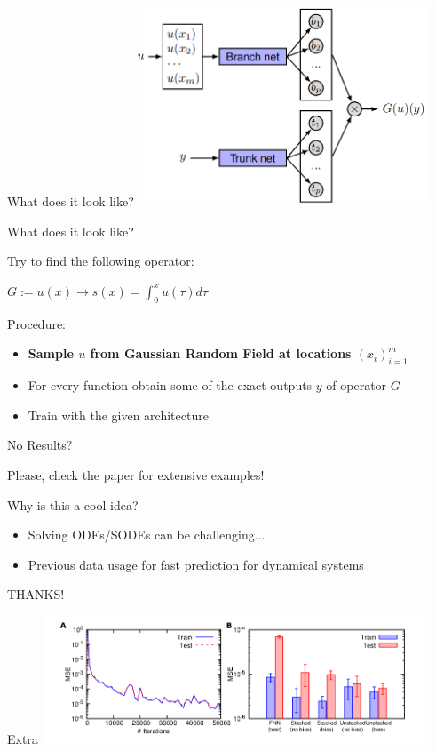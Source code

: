 \documentclass[aspectratio=169]{beamer}
\begin{document}
\begin{frame}{What does it look like?}
  \centering
    \includegraphics[width=0.65\textwidth]{Figures/pic.png}
\end{frame}

\begin{frame}{What does it look like?}
  \begin{minipage}{0.5\textwidth}
    \centering
     Try to find the following operator:

      $G:=u(x)\to s(x)=\int_0^x u(\tau)d\tau$

  \end{minipage}%
  \begin{minipage}{0.5\textwidth}
    \centering
     Procedure:
     \begin{itemize}
       \item \textbf{Sample $u$ from Gaussian  Random Field at locations $(x_i)_{i=1}^m$}
       \item For every function obtain some of the exact outputs $y$ of operator $G$
       \item Train with the given architecture
     \end{itemize}
  \end{minipage}
\end{frame}

\begin{frame}{No Results?}

  \color{Pink} Please, check the paper for extensive examples!

\end{frame}

\begin{frame}{Why is this a cool idea?}

    \begin{itemize}
       \item Solving ODEs/SODEs can be challenging...
       \item Previous data usage for fast prediction for dynamical systems
     \end{itemize} 

\end{frame}


\begin{frame}
    \color{Pink} 
    \centering
     THANKS!
\end{frame}

\begin{frame}{Extra}
  \centering
    \includegraphics[width=0.85\textwidth]{Figures/res.png}
\end{frame}
\end{document}
